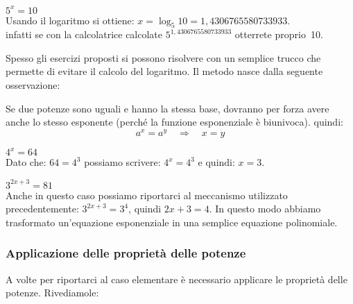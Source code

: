 \begin{esempio} \(5^x=10\)\\[4pt]
Usando il logaritmo si ottiene: \(x=\log_5 10 = 1,4306765580733933\).\\[2pt]
infatti se con la calcolatrice calcolate \(5^{1,4306765580733933}\) 
otterrete proprio~10.
\end{esempio}

Spesso gli esercizi proposti si possono risolvere con un semplice trucco che 
permette di evitare il calcolo del logaritmo. Il metodo nasce dalla seguente osservazione:

\begin{osservazione}
 Se due potenze sono uguali e hanno la stessa base, dovranno per 
forza avere anche lo stesso esponente (perché la funzione esponenziale è 
biunivoca). quindi: 
\[ a^x = a^y \quad \Longrightarrow \quad x=y\]
\end{osservazione}
\begin{esempio}
\(4^x=64\) \\[4pt]Dato che: \(64=4^3\) possiamo scrivere: \(4^x=4^3\) 
e quindi: \(x=3\).
\end{esempio}

\begin{esempio}
\(3^{2x+3}=81\)\\[4pt] Anche in questo caso possiamo riportarci al meccanismo 
utilizzato precedentemente: \(3^{2x+3}=3^4\), quindi 
\({2x+3}=4\). In questo modo abbiamo trasformato un'equazione esponenziale in 
una semplice equazione polinomiale.
\end{esempio}

\subsubsection{Applicazione delle proprietà delle potenze}
\label{subsubsec:esplog_eq_proprpot}

A volte per riportarci al caso elementare è necessario applicare le proprietà delle 
potenze. Rivediamole:

